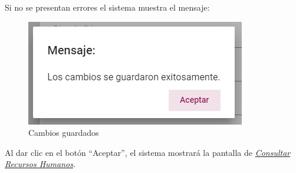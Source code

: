                 Si no se presentan errores el sistema muestra el mensaje:
                    
                 \begin{figure}[!hbtp]
                    \centering
                    \includegraphics[width=0.4\linewidth]{images/SP1/MSG31}
                    \caption{Cambios guardados}
                    \label{mensaje31}
                    
                \end{figure}
                
                Al dar clic en el botón “Aceptar”, el sistema mostrará la pantalla de \hyperlink{consultarRH}{\textit{Consultar Recursos Humanos}}.
                
